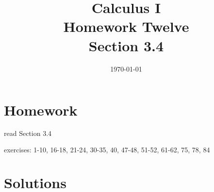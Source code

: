\documentclass[letterpaper, landscape]{exam}
\title{Calculus I \\ Homework Twelve \\ Section 3.4}
\author{}
\date{\today}
\begin{document}
  \maketitle

  \section{Homework}
    \begin{itemize*}
      \item read Section 3.4
      \item exercises: 1-10, 16-18, 21-24, 30-35, 40, 47-48, 51-52, 61-62, 75, 78, 84
    \end{itemize*}

  \ifprintanswers

  \section{Solutions}
\end{document}
